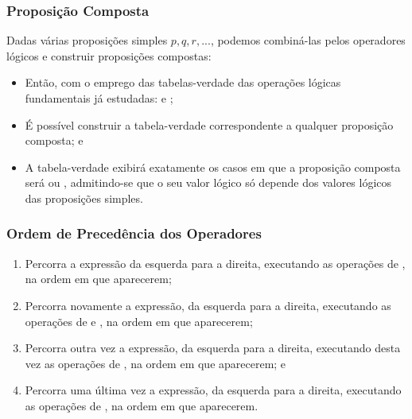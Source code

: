\documentclass{beamer}
\begin{document}
\begin{frame}
\frametitle{Proposição Composta}

Dadas várias proposições simples $p, q,r, . . .$, podemos combiná-las pelos operadores lógicos \structure{$\wedge, \vee, \rightarrow, \leftrightarrow$} e construir proposições compostas:\vfill

\begin{itemize}
	\item Então, com o emprego das tabelas-verdade das operações lógicas fundamentais já estudadas:  e ;
	\item É possível construir a tabela-verdade correspondente a qualquer proposição composta; e
	\item A tabela-verdade exibirá exatamente os casos em que a proposição composta será  ou , admitindo-se que o seu valor lógico só depende dos valores lógicos das proposições simples.
\end{itemize}
\end{frame}

\begin{frame}
\frametitle{Ordem de Precedência dos Operadores}

\begin{enumerate}
	\item Percorra a expressão da esquerda para a direita, executando as operações de , na ordem em que aparecerem;
	\item Percorra novamente a expressão, da esquerda para a direita, executando as operações de  e , na ordem em que aparecerem;
	\item Percorra outra vez a expressão, da esquerda para a direita, executando desta vez as operações de , na ordem em que aparecerem; e
	\item Percorra uma última vez a expressão, da esquerda para a direita, executando as operações de , na ordem em que aparecerem.
\end{enumerate}
\end{frame}
\end{document}
